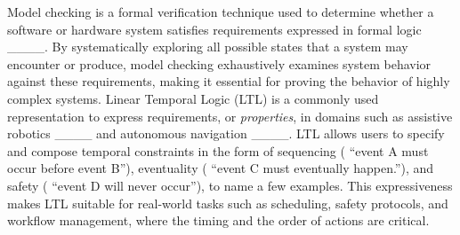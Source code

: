 Model checking is a formal verification technique used to determine whether a software or hardware system satisfies requirements expressed in formal logic ____. By systematically exploring all possible states that a system may encounter or produce, model checking exhaustively examines system behavior against these requirements, making it essential for proving the behavior of highly complex systems. Linear Temporal Logic (LTL) is a commonly used representation to express requirements, or \textit{properties}, in domains such as assistive robotics ____ and autonomous navigation ____. LTL allows users to specify and compose temporal constraints in the form of sequencing (\ie{} ``event A must occur before event B''), eventuality (\ie{} ``event C must eventually happen.''), and safety (\ie{} ``event D will never occur''), to name a few examples. This expressiveness makes LTL suitable for real-world tasks such as scheduling, safety protocols, and workflow management, where the timing and the order of actions are critical. %





